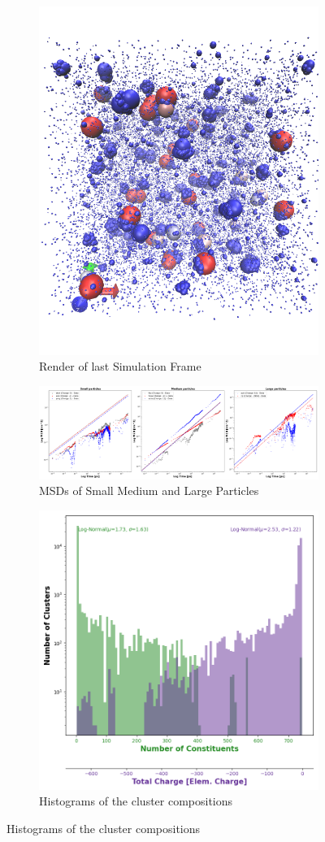 \documentclass[draft, english]{volcanica-template}
\begin{document}
\begin{figure}[!htbp]
\centering
\begin{figure}[!htbp]
\centering
\includegraphics[width=0.7\linewidth]{files/ChargeRender-3dbdd7b54096fb809c2acff9c9619e44.png}
\caption[]{Render of last Simulation Frame}
\label{Fig9}
\end{figure}

\begin{figure}[!htbp]
\centering
\includegraphics[width=0.7\linewidth]{files/Combined_MSD-f9d4672aec0b2f71b5b6b265ddbd2c1a.png}
\caption[]{MSDs of Small Medium and Large Particles}
\label{Fig9_IntCytoSys-b}
\end{figure}

\begin{figure}[!htbp]
\centering
\includegraphics[width=0.7\linewidth]{files/Cluster_Histogram_Fi-c986668020a4bec3825e3c996ce5c400.png}
\caption[]{Histograms of the cluster compositions}
\label{Fig9_IntCytoSys-c}
\end{figure}


\end{figure}
\end{document}
